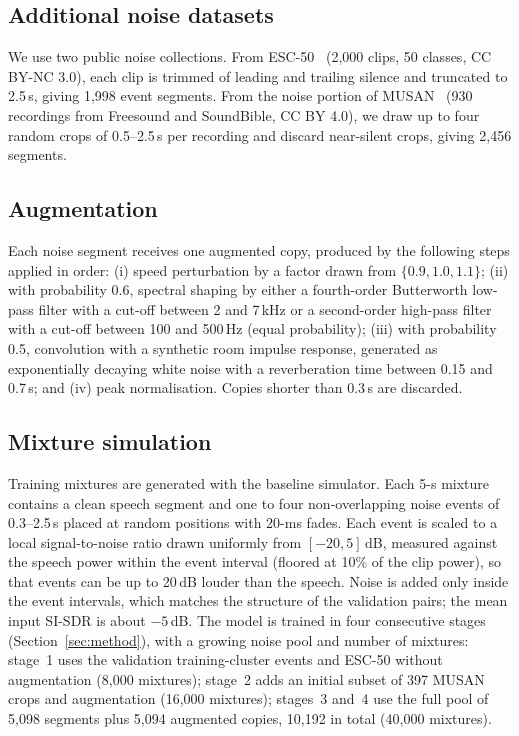 \documentclass[conference]{IEEEtran}
\begin{document}
\subsection{Additional noise datasets}
We use two public noise collections. From ESC-50~\cite{piczak2015esc} (2{,}000 clips, 50 classes, CC BY-NC 3.0), each clip is trimmed of leading and trailing silence and truncated to 2.5\,s, giving 1{,}998 event segments. From the noise portion of MUSAN~\cite{snyder2015musan} (930 recordings from Freesound and SoundBible, CC BY 4.0), we draw up to four random crops of 0.5--2.5\,s per recording and discard near-silent crops, giving 2{,}456 segments.

\subsection{Augmentation}
Each noise segment receives one augmented copy, produced by the following steps applied in order: (i) speed perturbation by a factor drawn from $\{0.9, 1.0, 1.1\}$; (ii) with probability 0.6, spectral shaping by either a fourth-order Butterworth low-pass filter with a cut-off between 2 and 7\,kHz or a second-order high-pass filter with a cut-off between 100 and 500\,Hz (equal probability); (iii) with probability 0.5, convolution with a synthetic room impulse response, generated as exponentially decaying white noise with a reverberation time between 0.15 and 0.7\,s; and (iv) peak normalisation. Copies shorter than 0.3\,s are discarded.

\subsection{Mixture simulation}
Training mixtures are generated with the baseline simulator. Each 5-s mixture contains a clean speech segment and one to four non-overlapping noise events of 0.3--2.5\,s placed at random positions with 20-ms fades. Each event is scaled to a local signal-to-noise ratio drawn uniformly from $[-20, 5]$\,dB, measured against the speech power within the event interval (floored at 10\% of the clip power), so that events can be up to 20\,dB louder than the speech. Noise is added only inside the event intervals, which matches the structure of the validation pairs; the mean input SI-SDR is about $-5$\,dB. The model is trained in four consecutive stages (Section~\ref{sec:method}), with a growing noise pool and number of mixtures: stage~1 uses the validation training-cluster events and ESC-50 without augmentation (8{,}000 mixtures); stage~2 adds an initial subset of 397 MUSAN crops and augmentation (16{,}000 mixtures); stages~3 and~4 use the full pool of 5{,}098 segments plus 5{,}094 augmented copies, 10{,}192 in total (40{,}000 mixtures).
\end{document}
